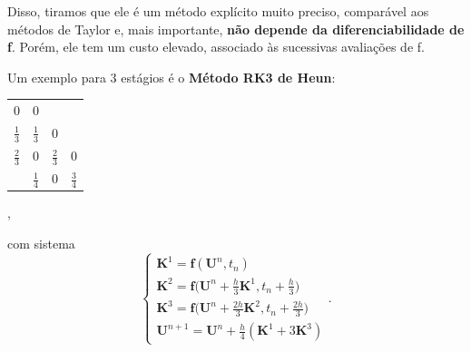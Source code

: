 \documentclass[../differential_methods.tex]{subfiles}
\begin{document}
Disso, tiramos que ele é um método explícito muito preciso, comparável aos métodos de Taylor e, mais importante, \textbf{não depende da diferenciabilidade de f}. Porém, ele tem um custo elevado, associado às sucessivas avaliações de f.
\begin{example}
	Um exemplo para 3 estágios é o \textbf{Método RK3 de Heun}:
	\begin{table}[H]
		\centering
		\begin{tabular}{c | c c c}
			0               & 0               &                 &                 \\
			\(\frac{1}{3}\) & \(\frac{1}{3}\) & 0               &                 \\
			\(\frac{2}{3}\) & 0               & \(\frac{2}{3}\) & 0               \\
			\hline
			                & \(\frac{1}{4}\) & 0               & \(\frac{3}{4}\)
		\end{tabular},
	\end{table}
	com sistema
	\[
		\left\{\begin{array}{ll}
			\mathbf{K}^{1} = \mathbf{f}(\mathbf{U}^{n}, t_{n})                                                      \\
			\mathbf{K}^{2} = \mathbf{f}\bigl(\mathbf{U}^{n} + \frac{h}{3}\mathbf{K}^{1}, t_{n}+ \frac{h}{3}\bigr)   \\
			\mathbf{K}^{3} = \mathbf{f}\bigl(\mathbf{U}^{n} + \frac{2h}{3}\mathbf{K}^{2}, t_{n}+ \frac{2h}{3}\bigr) \\
			\mathbf{U}^{n+1} = \mathbf{U}^{n} + \frac{h}{4} (\mathbf{K}^{1} + 3\mathbf{K}^{3})
		\end{array}\right..
	\]


\end{example}
\end{document}
